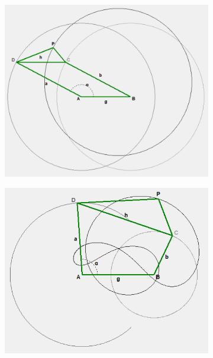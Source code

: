 \documentclass{article}
\begin{document}
\begin{figure}[h]
\begin{subfigure}{0.19\textwidth}
		\caption{}
	\end{subfigure}
	\hfill
	\begin{subfigure}{0.19\textwidth}
		\centering
		\includegraphics[width=\linewidth, height=0.95\linewidth, keepaspectratio]{./Figures/27_motion_cases/-100.png}
		\caption{}
	\end{subfigure}
	\vfill
	\begin{subfigure}{0.19\textwidth}
		\centering
		\includegraphics[width=\linewidth, height=0.95\linewidth, keepaspectratio]{./Figures/27_motion_cases/1-10.png}

\end{subfigure}
\end{figure}
\end{document}
